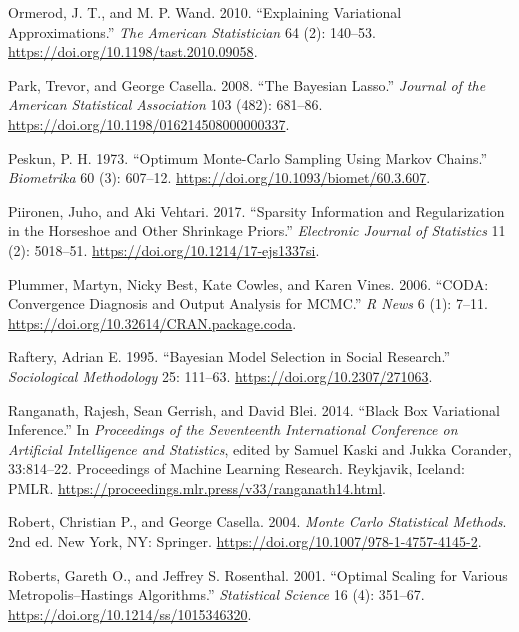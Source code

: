 \documentclass[
  11pt,
  letterpaper,
]{scrbook}
\newlength{\cslhangindent}
\newenvironment{CSLReferences}[2] %
 {\begin{list}{}{%
  \setlength{\itemindent}{0pt}
  \setlength{\leftmargin}{0pt}
  \setlength{\parsep}{0pt}
  \ifodd #1
   \setlength{\leftmargin}{\cslhangindent}
   \setlength{\itemindent}{-1\cslhangindent}
  \fi
  \setlength{\itemsep}{#2\baselineskip}}}
 {\end{list}}
\theoremstyle{plain}
\theoremstyle{definition}
\theoremstyle{definition}
\theoremstyle{plain}
\theoremstyle{plain}
\theoremstyle{definition}
\theoremstyle{remark}
\begin{document}
\begin{CSLReferences}{1}{0}
Ormerod, J. T., and M. P. Wand. 2010. {``Explaining Variational
Approximations.''} \emph{The American Statistician} 64 (2): 140--53.
\url{https://doi.org/10.1198/tast.2010.09058}.

Park, Trevor, and George Casella. 2008. {``The {B}ayesian {L}asso.''}
\emph{Journal of the American Statistical Association} 103 (482):
681--86. \url{https://doi.org/10.1198/016214508000000337}.

Peskun, P. H. 1973. {``Optimum {M}onte-{C}arlo Sampling Using {M}arkov
Chains.''} \emph{Biometrika} 60 (3): 607--12.
\url{https://doi.org/10.1093/biomet/60.3.607}.

Piironen, Juho, and Aki Vehtari. 2017. {``Sparsity Information and
Regularization in the Horseshoe and Other Shrinkage Priors.''}
\emph{Electronic Journal of Statistics} 11 (2): 5018--51.
\url{https://doi.org/10.1214/17-ejs1337si}.

Plummer, Martyn, Nicky Best, Kate Cowles, and Karen Vines. 2006.
{``{CODA}: Convergence Diagnosis and Output Analysis for {MCMC}.''}
\emph{R News} 6 (1): 7--11.
\url{https://doi.org/10.32614/CRAN.package.coda}.

Raftery, Adrian E. 1995. {``Bayesian Model Selection in Social
Research.''} \emph{Sociological Methodology} 25: 111--63.
\url{https://doi.org/10.2307/271063}.

Ranganath, Rajesh, Sean Gerrish, and David Blei. 2014. {``{Black Box
Variational Inference}.''} In \emph{Proceedings of the Seventeenth
International Conference on Artificial Intelligence and Statistics},
edited by Samuel Kaski and Jukka Corander, 33:814--22. Proceedings of
Machine Learning Research. Reykjavik, Iceland: PMLR.
\url{https://proceedings.mlr.press/v33/ranganath14.html}.

Robert, Christian P., and George Casella. 2004. \emph{{M}onte {C}arlo
Statistical Methods}. 2nd ed. New York, NY: Springer.
\url{https://doi.org/10.1007/978-1-4757-4145-2}.

Roberts, Gareth O., and Jeffrey S. Rosenthal. 2001. {``Optimal Scaling
for Various {M}etropolis--{H}astings Algorithms.''} \emph{Statistical
Science} 16 (4): 351--67. \url{https://doi.org/10.1214/ss/1015346320}.


\end{CSLReferences}
\end{document}
